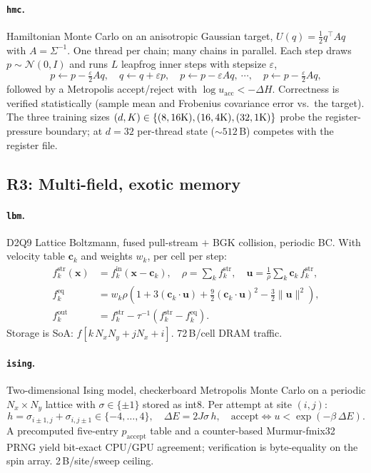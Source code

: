 \documentclass{article}
\theoremstyle{plain}
\theoremstyle{definition}
\theoremstyle{remark}
\begin{document}
\paragraph{\texttt{hmc}.} Hamiltonian Monte Carlo on an anisotropic Gaussian
target, $U(q)=\tfrac12 q^\top A q$ with $A=\Sigma^{-1}$. One thread
per chain; many chains in parallel. Each step draws
$p\sim\mathcal{N}(0,I)$ and runs $L$ leapfrog inner steps with
stepsize $\varepsilon$,
\begin{equation}
p \leftarrow p - \tfrac{\varepsilon}{2}A q,\quad
q \leftarrow q + \varepsilon p,\quad
p \leftarrow p - \varepsilon Aq,\ \cdots,\quad
p \leftarrow p - \tfrac{\varepsilon}{2}A q,
\end{equation}
followed by a Metropolis accept/reject with
$\log u_{\mathrm{acc}}<-\Delta H$. Correctness is verified
statistically (sample mean and Frobenius covariance error vs.\ the
target). The three training sizes
$(d,K)\in\{(8,16{\rm K}),(16,4{\rm K}),(32,1{\rm K})\}$ probe the
register-pressure boundary; at $d{=}32$ per-thread state
(${\sim}512$\,B) competes with the register file.

\subsection{R3: Multi-field, exotic memory}

\paragraph{\texttt{lbm}.} D2Q9 Lattice Boltzmann, fused pull-stream $+$ BGK
collision, periodic BC. With velocity table $\mathbf{c}_k$ and
weights $w_k$, per cell per step:
\begin{align}
f^{\mathrm{str}}_k(\mathbf{x})
   &= f^{\mathrm{in}}_k(\mathbf{x}-\mathbf{c}_k),\quad
\rho = \textstyle\sum_k f^{\mathrm{str}}_k,\quad
\mathbf{u} = \tfrac{1}{\rho}\sum_k \mathbf{c}_k\,f^{\mathrm{str}}_k, \\
f^{\mathrm{eq}}_k &= w_k\rho\!\left(1+3(\mathbf{c}_k{\cdot}\mathbf{u})
   +\tfrac{9}{2}(\mathbf{c}_k{\cdot}\mathbf{u})^2 - \tfrac{3}{2}\|\mathbf{u}\|^2\right),\\
f^{\mathrm{out}}_k &= f^{\mathrm{str}}_k - \tau^{-1}\!\left(f^{\mathrm{str}}_k - f^{\mathrm{eq}}_k\right).
\end{align}
Storage is SoA: $f[k\,N_xN_y + jN_x + i]$. 72\,B/cell DRAM traffic.

\paragraph{\texttt{ising}.} Two-dimensional Ising model, checkerboard
Metropolis Monte Carlo on a periodic $N_x{\times}N_y$ lattice with
$\sigma\in\{\pm 1\}$ stored as int8. Per attempt at site $(i,j)$:
\begin{equation}
h = \sigma_{i\pm 1,j}+\sigma_{i,j\pm 1}\in\{-4,\ldots,4\},\quad
\Delta E = 2J\sigma\,h,\quad
\mathrm{accept}\iff u<\exp(-\beta\,\Delta E).
\end{equation}
A precomputed five-entry $p_{\mathrm{accept}}$ table and a
counter-based Murmur-fmix32 PRNG yield bit-exact CPU/GPU agreement;
verification is byte-equality on the spin array. 2\,B/site/sweep
ceiling.
\end{document}
